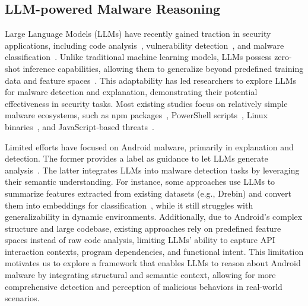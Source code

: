 \subsection{LLM-powered Malware Reasoning}
Large Language Models (LLMs) have recently gained traction in security applications, including code analysis~\cite{code_sum}, vulnerability detection~\cite{llm4vuln,llm4vuln_bench}, and malware classification~\cite{llm_syscall}. Unlike traditional machine learning models, LLMs possess zero-shot inference capabilities, allowing them to generalize beyond predefined training data and feature spaces~\cite{large_zero,toolformer}. This adaptability has led researchers to explore LLMs for malware detection and explanation, demonstrating their potential effectiveness in security tasks. Most existing studies focus on relatively simple malware ecosystems, such as npm packages~\cite{npm_malware}, PowerShell scripts~\cite{raconteur}, Linux binaries~\cite{llm_syscall}, and JavaScript-based threats~\cite{tactics}. 

Limited efforts have focused on Android malware, primarily in explanation and detection. The former provides a label as guidance to let LLMs generate analysis~\cite{malware_exploring,malware_decisioncentric}. The latter integrates LLMs into malware detection tasks by leveraging their semantic understanding. For instance, some approaches use LLMs to summarize features extracted from existing datasets (e.g., Drebin) and convert them into embeddings for classification~\cite{apppoet}, while it still struggles with generalizability in dynamic environments. Additionally, due to Android’s complex structure and large codebase, existing approaches rely on predefined feature spaces instead of raw code analysis, limiting LLMs' ability to capture API interaction contexts, program dependencies, and functional intent. This limitation motivates us to explore a framework that enables LLMs to reason about Android malware by integrating structural and semantic context, allowing for more comprehensive detection and perception of malicious behaviors in real-world scenarios.


 